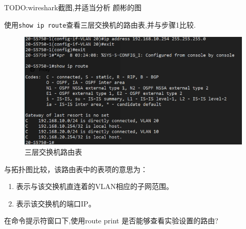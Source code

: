 \documentclass{myreport}
\begin{document}
TODO:wireshark截图,并适当分析
颜彬的图

\begin{tcolorbox}[title = {观察三}]
使用\texttt{show ip route}查看三层交换机的路由表,并与步骤1比较.
\end{tcolorbox}

\begin{figure}[htp]
    \centering
    \includegraphics[width=13cm]{"./figure/2018-05-17-23-09-34.png"}
    \caption{三层交换机路由表}
    \label{fig:e2-s10-route}
\end{figure}

与拓扑图比较，该路由表中的表项的意思为：

\begin{enumerate}
    \item 表示与该交换机直连着的VLAN相应的子网范围。
    \item 表示该交换机的端口IP。
\end{enumerate}



\begin{tcolorbox}[title = {观察四}]
在命令提示符窗口下,使用route print 是否能够查看实验设置的路由?
\end{tcolorbox}
\end{document}

